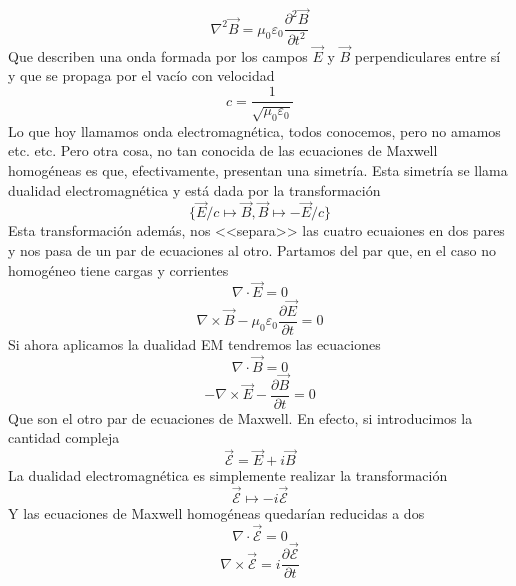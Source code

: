 \documentclass[12pt]{article}
\begin{document}
\begin{equation}
    \nabla^2 \vec B =\mu_0\varepsilon_0\frac{\partial^2 \vec B}{\partial t^2}
\end{equation}
Que describen una onda formada por los campos $\vec E$ y $\vec B$ perpendiculares entre sí y que se propaga por el vacío con velocidad
\begin{equation}
    c=\frac{1}{\sqrt{\mu_0\varepsilon_0}}
\end{equation}
Lo que hoy llamamos onda electromagnética, todos conocemos, pero no amamos etc. etc. Pero otra cosa, no tan conocida de las ecuaciones de Maxwell homogéneas es que, efectivamente, presentan una simetría. Esta simetría se llama dualidad electromagnética y está dada por la transformación 
$$\{\vec E/c\mapsto \vec B, \vec B \mapsto -\vec E/c\}$$
Esta transformación además, nos <<separa>> las cuatro ecuaiones en dos pares y nos pasa de un par de ecuaciones al otro. Partamos del par que, en el caso no homogéneo tiene cargas y corrientes 
\begin{equation}
    \nabla \cdot \vec E =0
\end{equation}
\begin{equation}
    \nabla \times \vec B -\mu_0\varepsilon_0 \frac{\partial \vec E}{\partial t}=0
\end{equation}
Si ahora aplicamos la dualidad EM tendremos las ecuaciones
\begin{equation}
    \nabla \cdot \vec B =0
\end{equation}
\begin{equation}
    -\nabla \times \vec E -\frac{\partial \vec B}{\partial t}=0
\end{equation}
Que son el otro par de ecuaciones de Maxwell. En efecto, si introducimos la cantidad compleja
\begin{equation}
    \vec{ \mathcal{E}}=\vec E + i\vec B
\end{equation}
La dualidad electromagnética es simplemente realizar la transformación 
\begin{equation}
    \vec {\mathcal{E}}\mapsto -i\vec {\mathcal{E}}
\end{equation}
Y las ecuaciones de Maxwell homogéneas quedarían reducidas a dos 
\begin{equation}
    \nabla \cdot \vec{\mathcal{E}}=0 
\end{equation}
\begin{equation}
    \nabla \times \vec{\mathcal{E}} =i\frac{\partial \vec{\mathcal{E}}}{\partial t}
\end{equation}
\end{document}
